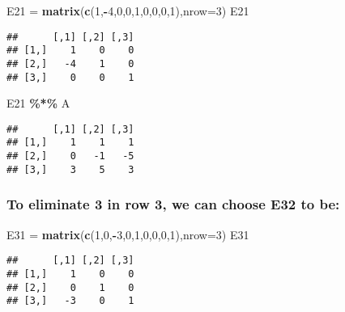 \documentclass[
]{article}
\newenvironment{Shaded}{\begin{snugshade}}{\end{snugshade}}
\newcommand{\AttributeTok}[1]{\textcolor[rgb]{0.13,0.29,0.53}{#1}}
\newcommand{\DecValTok}[1]{\textcolor[rgb]{0.00,0.00,0.81}{#1}}
\newcommand{\FunctionTok}[1]{\textcolor[rgb]{0.13,0.29,0.53}{\textbf{#1}}}
\newcommand{\NormalTok}[1]{#1}
\newcommand{\OtherTok}[1]{\textcolor[rgb]{0.56,0.35,0.01}{#1}}
\newcommand{\SpecialCharTok}[1]{\textcolor[rgb]{0.81,0.36,0.00}{\textbf{#1}}}
\begin{document}
\begin{Shaded}
\begin{Highlighting}[]
\NormalTok{E21 }\OtherTok{=} \FunctionTok{matrix}\NormalTok{(}\FunctionTok{c}\NormalTok{(}\DecValTok{1}\NormalTok{,}\SpecialCharTok{{-}}\DecValTok{4}\NormalTok{,}\DecValTok{0}\NormalTok{,}\DecValTok{0}\NormalTok{,}\DecValTok{1}\NormalTok{,}\DecValTok{0}\NormalTok{,}\DecValTok{0}\NormalTok{,}\DecValTok{0}\NormalTok{,}\DecValTok{1}\NormalTok{),}\AttributeTok{nrow=}\DecValTok{3}\NormalTok{)}
\NormalTok{E21}
\end{Highlighting}
\end{Shaded}

\begin{verbatim}
##      [,1] [,2] [,3]
## [1,]    1    0    0
## [2,]   -4    1    0
## [3,]    0    0    1
\end{verbatim}

\begin{Shaded}
\begin{Highlighting}[]
\NormalTok{E21 }\SpecialCharTok{\%*\%}\NormalTok{ A}
\end{Highlighting}
\end{Shaded}

\begin{verbatim}
##      [,1] [,2] [,3]
## [1,]    1    1    1
## [2,]    0   -1   -5
## [3,]    3    5    3
\end{verbatim}

\hypertarget{to-eliminate-3-in-row-3-we-can-choose-e32-to-be}{%
\subsubsection{To eliminate 3 in row 3, we can choose E32 to
be:}\label{to-eliminate-3-in-row-3-we-can-choose-e32-to-be}}

\begin{Shaded}
\begin{Highlighting}[]
\NormalTok{E31 }\OtherTok{=} \FunctionTok{matrix}\NormalTok{(}\FunctionTok{c}\NormalTok{(}\DecValTok{1}\NormalTok{,}\DecValTok{0}\NormalTok{,}\SpecialCharTok{{-}}\DecValTok{3}\NormalTok{,}\DecValTok{0}\NormalTok{,}\DecValTok{1}\NormalTok{,}\DecValTok{0}\NormalTok{,}\DecValTok{0}\NormalTok{,}\DecValTok{0}\NormalTok{,}\DecValTok{1}\NormalTok{),}\AttributeTok{nrow=}\DecValTok{3}\NormalTok{)}
\NormalTok{E31}
\end{Highlighting}
\end{Shaded}

\begin{verbatim}
##      [,1] [,2] [,3]
## [1,]    1    0    0
## [2,]    0    1    0
## [3,]   -3    0    1
\end{verbatim}
\end{document}
